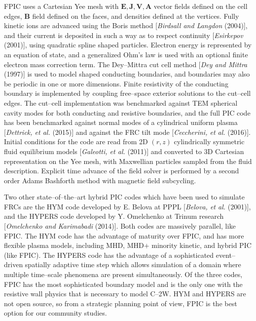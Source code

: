 \documentclass[a4paper,openany,12pt]{book}
\begin{document}
FPIC uses a Cartesian Yee mesh with $\bm{E, J, V, A}$ vector fields defined on the cell edges, $\bm{B}$ field defined on the faces, and densities defined at the vertices. Fully kinetic ions are advanced using the Boris method [\emph{Birdsall and Langdon} (2004)], and their current is deposited in such a way as to respect continuity [\emph{Esirkepov} (2001)], using quadratic spline shaped particles. Electron energy is represented by an equation of state, and a generalized Ohm's law is used with an optional finite electron mass correction term. The Dey--Mittra cut cell method [\emph{Dey and Mittra} (1997)] is used to model shaped conducting boundaries, and boundaries may also be periodic in one or more dimensions. Finite resistivity of the conducting boundary is implemented by coupling free--space exterior solutions to the cut--cell edges. The cut--cell implementation was benchmarked against TEM spherical cavity modes for both conducting and resistive boundaries, and the full PIC code has been benchmarked against normal modes of a cylindrical uniform plasma [\emph{Dettrick, et al.} (2015)] and against the FRC tilt mode [\emph{Ceccherini, et al.} (2016)]. Initial conditions for the code are read from 2D $(r, z)$ cylindrically symmetric fluid equilibrium models [\emph{Galeotti, et al.} (2011)] and converted to 3D Cartesian representation on the Yee mesh, with Maxwellian particles sampled from the fluid description. Explicit time advance of the field solver is performed by a second order Adams Bashforth method with magnetic field subcycling.

Two other state--of--the--art hybrid PIC codes which have been used to simulate FRCs are the HYM code developed by E. Belova at PPPL [\emph{Belova, et al.} (2001)], and the HYPERS code developed by Y. Omelchenko at Trinum research [\emph{Omelchenko and Karimabadi} (2014)]. Both codes are massively parallel, like FPIC. The HYM code has the advantage of maturity over FPIC, and has more flexible plasma models, including MHD, MHD$+$ minority kinetic, and hybrid PIC (like FPIC). The HYPERS code has the advantage of a sophisticated event--driven spatially adaptive time step which allows simulation of a domain where multiple time--scale phenomena are present simultaneously. Of the three codes, FPIC has the most sophisticated boundary model and is the only one with the resistive wall physics that is necessary to model C--2W. HYM and HYPERS are not open source, so from a strategic planning point of view, FPIC is the best option for our community studies.
\end{document}
